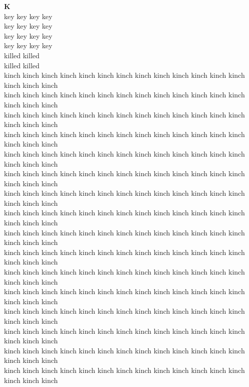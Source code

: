 \vspace{14pt}
\noindent\textbf{\Large K}\\[+12pt]
key key key key\\
key key key key\\
key key key key\\
key key key key\\
killed killed\\
killed killed\\
kinch kinch kinch kinch kinch kinch kinch kinch kinch kinch kinch kinch kinch kinch kinch kinch\\
kinch kinch kinch kinch kinch kinch kinch kinch kinch kinch kinch kinch kinch kinch kinch kinch\\
kinch kinch kinch kinch kinch kinch kinch kinch kinch kinch kinch kinch kinch kinch kinch kinch\\
kinch kinch kinch kinch kinch kinch kinch kinch kinch kinch kinch kinch kinch kinch kinch kinch\\
kinch kinch kinch kinch kinch kinch kinch kinch kinch kinch kinch kinch kinch kinch kinch kinch\\
kinch kinch kinch kinch kinch kinch kinch kinch kinch kinch kinch kinch kinch kinch kinch kinch\\
kinch kinch kinch kinch kinch kinch kinch kinch kinch kinch kinch kinch kinch kinch kinch kinch\\
kinch kinch kinch kinch kinch kinch kinch kinch kinch kinch kinch kinch kinch kinch kinch kinch\\
kinch kinch kinch kinch kinch kinch kinch kinch kinch kinch kinch kinch kinch kinch kinch kinch\\
kinch kinch kinch kinch kinch kinch kinch kinch kinch kinch kinch kinch kinch kinch kinch kinch\\
kinch kinch kinch kinch kinch kinch kinch kinch kinch kinch kinch kinch kinch kinch kinch kinch\\
kinch kinch kinch kinch kinch kinch kinch kinch kinch kinch kinch kinch kinch kinch kinch kinch\\
kinch kinch kinch kinch kinch kinch kinch kinch kinch kinch kinch kinch kinch kinch kinch kinch\\
kinch kinch kinch kinch kinch kinch kinch kinch kinch kinch kinch kinch kinch kinch kinch kinch\\
kinch kinch kinch kinch kinch kinch kinch kinch kinch kinch kinch kinch kinch kinch kinch kinch\\
kinch kinch kinch kinch kinch kinch kinch kinch kinch kinch kinch kinch kinch kinch kinch kinch\\
